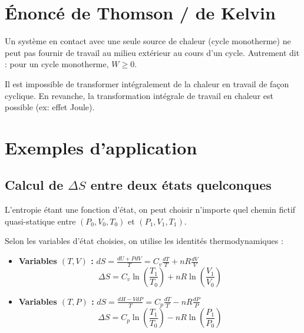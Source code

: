 \documentclass[french]{yLectureNote}
\begin{document}
\section{Énoncé de Thomson / de Kelvin}


\begin{theorem}
    Un système en contact avec une seule source de chaleur (cycle monotherme) ne peut pas fournir de travail au milieu extérieur au cours d'un cycle. 
    Autrement dit : pour un cycle monotherme, $W \geq 0$.
\end{theorem}

\begin{theorem}[Conséquence]
    Il est impossible de transformer intégralement de la chaleur en travail de façon cyclique. En revanche, la transformation intégrale de travail en chaleur est possible (ex: effet Joule).
\end{theorem}

\section{Exemples d'application}
\subsection{Calcul de $\Delta S$ entre deux états quelconques}

L'entropie étant une fonction d'état, on peut choisir n'importe quel chemin fictif quasi-statique entre $(P_0, V_0, T_0)$ et $(P_1, V_1, T_1)$.

\begin{proposition}
    Selon les variables d'état choisies, on utilise les identités thermodynamiques :
    \begin{itemize}
        \item \textbf{Variables $(T, V)$ :} $dS = \frac{dU + P dV}{T} = C_v \frac{dT}{T} + nR \frac{dV}{V}$
        $$\Delta S = C_v \ln\left(\frac{T_1}{T_0}\right) + nR \ln\left(\frac{V_1}{V_0}\right)$$
        \item \textbf{Variables $(T, P)$ :} $dS = \frac{dH - V dP}{T} = C_p \frac{dT}{T} - nR \frac{dP}{P}$
        $$\Delta S = C_p \ln\left(\frac{T_1}{T_0}\right) - nR \ln\left(\frac{P_1}{P_0}\right)$$
    \end{itemize}
\end{proposition}
\end{document}
